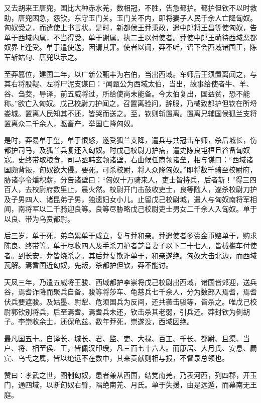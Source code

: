 \documentclass[]{article}
\begin{document}
又去胡来王唐兜，国比大种赤水羌，数相冠，不胜，告急都护。都护但钦不以时救助，唐兜困急，怨钦，东守玉门关。玉门关不内，即将妻子人民千余人亡降匈奴。匈奴受之，而遣使上书言状。是时，新都侯王莽秉政，遣中郎将王昌等使匈奴，告单于西域内属，不当得受。单于谢属。执二王以付使者。莽使中郎王萌待西域恶都奴界上逢受。单于遣使送，因请其罪。使者以闻，莽不听，诏下会西域诸国王，陈军斩姑句、唐兜以示之。

至莽篡位，建国二年，以广新公甄丰为右伯，当出西域。车师后王须置离闻之，与其右将股鞮、左将尸泥支谋曰：``闻甄公为西域太伯，当出，故事给使者牛、羊、谷、刍茭，导译，前五威将过，所给使尚未能备。今太伯复出，国益贫，恐不能称。''欲亡入匈奴。戊己校尉刀护闻之，召置离验问，辞服，乃械致都护但钦在所埒娄城。置离人民知其不还，皆哭而送之。至，钦则斩置离。置离兄辅国侯狐兰支将置离众二千余人，驱畜产，举国亡降匈奴。

是时，莽易单于玺，单于恨怒，遂受狐兰支降，遣兵与共冠击车师，杀后城长，伤都护司马，及狐兰兵复还入匈奴。时戊己校尉刀护病，遣史陈良屯桓且谷备匈奴寇。史终带取粮食，司马丞韩玄领诸壁，右曲候任商领诸垒，相与谋曰：``西域诸国颇背叛，匈奴欲大侵。要死。可杀校尉，将人众降匈奴。''即将数千骑至校尉府，胁诸亭令燔积薪，分告诸壁曰：``匈奴十万骑来人，吏士皆持兵，后者斩！''得三四百人，去校尉府数里止，晨火然。校尉开门击鼓收吏士，良等随人，遂杀校尉刀护及子男四人、诸昆弟子男，独遗妇女小儿。止留戊己校尉城，遣人与匈奴南将军相闻，南将军以二千骑迎良等。良等尽胁略戊己校尉吏士男女二千余人入匈奴。单于以良、带为乌贲都尉。

后三岁，单于死，弟乌累单于咸立，复与莽和亲。莽遣使者多赍金币赂单于，购求陈良、终带等。单于尽收四人及手杀刀护者芝音妻子以下二十七人，皆械槛车付使者。到长安，莽皆烧杀之。其后莽复欺诈单于，和亲遂绝。匈奴大击北边，而西域瓦解。焉耆国近匈奴，先叛，杀都护但钦，莽不能讨。

天凤三年，乃遣五威将王骏、西域都护李崇将戊己校尉出西域，诸国皆郊迎，送兵谷，焉耆诈降而聚兵自备。骏等将莎车、龟慈兵七千余人，分为数部入焉耆，焉耆伏兵要遮骏。及姑墨、尉犁、危须国兵为反间，还共袭击骏等，皆杀之。唯戊己校尉郭钦别将兵，后至焉耆。焉耆兵未还，钦击杀其老弱，引兵还。莽封钦为剼胡子。李崇收余士，还保龟兹。数年莽死，崇遂没，西域因绝。

最凡国五十。自译长、城长、君、监、吏、大禄、百工、千长、都尉、且渠、当户、将、相至侯、王，皆佩汉印绶，凡三百七十六人。而康居、大月氏、安息、罽宾、乌弋之属，皆以绝远不在数中，其来贡献则相与报，不督录总领也。

赞曰：孝武之世，图制匈奴，患者兼从西国，结党南羌，乃表河西，列四郡，开玉门，通四域，以断匈奴右臂，隔绝南羌、月氏。单于失援，由是远遁，而幕南无王庭。
\end{document}
